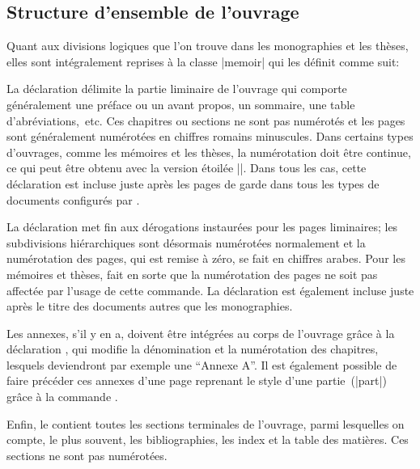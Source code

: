 \subsection{Structure d'ensemble de l'ouvrage}

Quant aux divisions logiques que l'on trouve dans les monographies et les thèses, elles sont intégralement reprises à la classe |memoir| qui les définit comme suit:

\begin{macro}
\frontmatter %
\mainmatter %
\appendix %
\backmatter %
\end{macro}

La déclaration  délimite la partie liminaire de l'ouvrage qui comporte généralement une préface ou un avant propos, un sommaire, une table d'abréviations,~etc. Ces chapitres ou sections ne sont pas numérotés et les pages sont généralement numérotées en chiffres romains minuscules. Dans certains types d'ouvrages, comme les mémoires et les thèses, la numérotation doit être continue, ce qui peut être obtenu avec la version étoilée |\frontmatter*|. Dans tous les cas, cette déclaration est incluse juste après les pages de garde dans tous les types de documents configurés par \frenchlaw.

La déclaration  met fin aux dérogations instaurées pour les pages liminaires; les subdivisions hiérarchiques sont désormais numérotées normalement et la numérotation des pages, qui est remise à zéro, se fait en chiffres arabes. Pour les mémoires et thèses, \frenchlaw fait en sorte que la numérotation des pages ne soit pas affectée par l'usage de cette commande. La déclaration est également incluse juste après le titre des documents autres que les monographies.

Les annexes, s'il y en a, doivent être intégrées au corps de l'ouvrage grâce à la déclaration , qui modifie la dénomination et la numérotation des chapitres, lesquels deviendront par exemple une \enquote{Annexe A}. Il est également possible de faire précéder ces annexes d'une page reprenant le style d'une partie~(|part|) grâce à la commande .

Enfin, le  contient toutes les sections terminales de l'ouvrage, parmi lesquelles on compte, le plus souvent, les bibliographies, les index et la table des matières. Ces sections ne sont pas numérotées.

